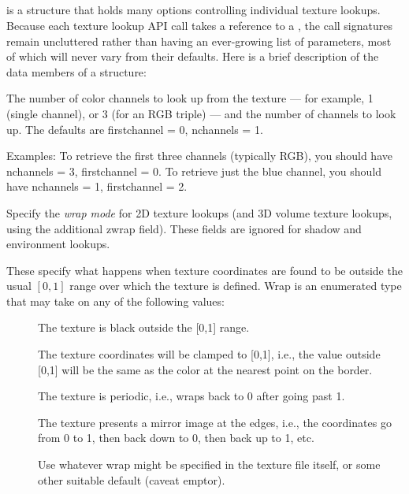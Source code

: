 \subsection{\TextureOptions}

\TextureOptions is a structure that holds many options controlling
individual texture lookups.  Because each texture lookup API call takes
a reference to a \TextureOptions, the call signatures remain uncluttered
rather than having an ever-growing list of parameters, most of which
will never vary from their defaults.  Here is a brief description of
the data members of a \TextureOptions structure:

The number of color channels to look up from the texture --- for
example, 1 (single channel), or 3 (for an RGB triple) --- and the number
of channels to look up.  The defaults are firstchannel = 0, nchannels =
1.

Examples: To retrieve the first three channels (typically RGB), you
should have nchannels = 3, firstchannel = 0.  To retrieve just the blue
channel, you should have nchannels = 1, firstchannel = 2.
\apiend

Specify the \emph{wrap mode} for 2D texture lookups (and 3D volume
texture lookups, using the additional {\cf zwrap} field).  These fields
are ignored for shadow and environment lookups.

These specify what happens when texture coordinates are found to be
outside the usual $[0,1]$ range over which the texture is defined.
{\cf Wrap} is an enumerated type that may take on any of the
following values:
\begin{description}
\item[\spc] \spc
\item[\rm {}] The texture is black outside the [0,1] range.
\item[\rm {}] The texture coordinates will be clamped to
  [0,1], i.e., the value outside [0,1] will be the same as the color
  at the nearest point on the border.
\item[\rm {}] The texture is periodic, i.e., wraps back
  to 0 after going past 1.
\item[\rm {}] The texture presents a mirror image at the
  edges, i.e., the coordinates go from 0 to 1, then back down to 0, then
  back up to 1, etc.
\item[\rm {}] Use whatever wrap might be specified in the
  texture file itself, or some other suitable default (caveat emptor).
\end{description}

